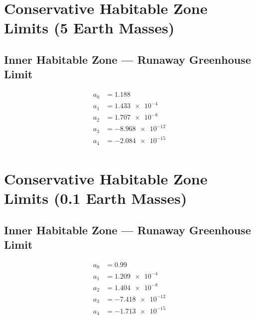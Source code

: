 \documentclass{article}
\begin{document}
\section{Conservative Habitable Zone Limits (5 Earth Masses)}

\subsection{Inner Habitable Zone --- Runaway Greenhouse Limit}
\begin{align*}
	a_{0} & =\num{1.188}      \\
	a_{1} & =\num{1.433e-4}   \\
	a_{2} & =\num{1.707e-8}   \\
	a_{3} & =\num{-8.968e-12} \\
	a_{4} & =\num{-2.084e-15} \\
\end{align*}

\section{Conservative Habitable Zone Limits (0.1 Earth Masses)}

\subsection{Inner Habitable Zone --- Runaway Greenhouse Limit}
\begin{align*}
	a_{0} & =\num{0.99}       \\
	a_{1} & =\num{1.209e-4}   \\
	a_{2} & =\num{1.404e-8}   \\
	a_{3} & =\num{-7.418e-12} \\
	a_{4} & =\num{-1.713e-15} \\
\end{align*}
\end{document}
